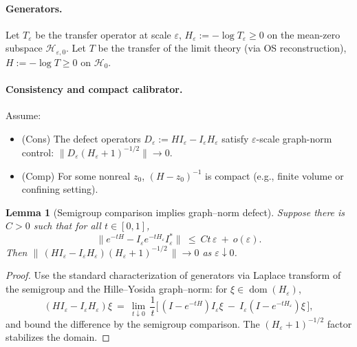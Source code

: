\documentclass[11pt]{amsart}
\theoremstyle{plain}
\newtheorem{lemma}[theorem]{Lemma}
\theoremstyle{definition}
\theoremstyle{remark}
\begin{document}
\paragraph{Generators.}
Let $T_{\varepsilon}$ be the transfer operator at scale $\varepsilon$, $H_{\varepsilon}:=-\log T_{\varepsilon}\ge 0$ on the mean-zero subspace $\mathcal H_{\varepsilon,0}$. Let $T$ be the transfer of the limit theory (via OS reconstruction), $H:=-\log T\ge 0$ on $\mathcal H_0$.
\paragraph{Consistency and compact calibrator.}
Assume:
\begin{itemize}
  \item (Cons) The defect operators $D_{\varepsilon}:=H I_{\varepsilon}-I_{\varepsilon} H_{\varepsilon}$ satisfy $\varepsilon$-scale graph-norm control: $\|D_{\varepsilon}(H_{\varepsilon}+1)^{-1/2}\|\to 0$.
  \item (Comp) For some nonreal $z_0$, $(H-z_0)^{-1}$ is compact (e.g., finite volume or confining setting).
\end{itemize}

\begin{lemma}[Semigroup comparison implies graph–norm defect]
Suppose there is $C>0$ such that for all $t\in[0,1]$,
\[
  \bigl\|e^{-tH}-I_{\varepsilon}e^{-tH_{\varepsilon}}I_{\varepsilon}^*\bigr\|\ \le\ C t\,\varepsilon\ +\ o(\varepsilon).
\]
Then $\|\,(H I_{\varepsilon}-I_{\varepsilon} H_{\varepsilon})(H_{\varepsilon}+1)^{-1/2}\,\|\to 0$ as $\varepsilon\downarrow 0$.
\end{lemma}

\begin{proof}
Use the standard characterization of generators via Laplace transform of the semigroup and the Hille–Yosida graph–norm: for $\xi\in\operatorname{dom}(H_{\varepsilon})$,
\[
  (H I_{\varepsilon}-I_{\varepsilon} H_{\varepsilon})\xi\ =\ \lim_{t\downarrow 0}\,\frac{1}{t}\bigl[\,(I-e^{-tH})I_{\varepsilon}\xi\ -\ I_{\varepsilon}(I-e^{-tH_{\varepsilon}})\xi\,\bigr],
\]
and bound the difference by the semigroup comparison. The $(H_{\varepsilon}+1)^{-1/2}$ factor stabilizes the domain.
\end{proof}
\end{document}
